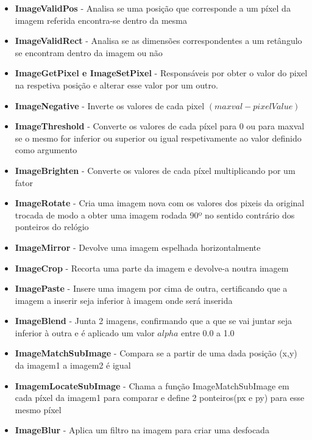     \begin{itemize}
        \item \textbf{ImageValidPos} - Analisa se uma posição que corresponde a um píxel da imagem referida
            encontra-se dentro da mesma
        \item \textbf{ImageValidRect} - Analisa se as dimensões correspondentes a um retângulo se encontram
            dentro da imagem ou não
        \item \textbf{ImageGetPixel e ImageSetPixel} - Responsáveis por obter o valor do pixel
            na respetiva posição e alterar esse valor por um outro.
        \item \textbf{ImageNegative} - Inverte os valores de cada pixel $(maxval - pixelValue)$
        \item \textbf{ImageThreshold} - Converte os valores de cada píxel para 0 ou para maxval
            se o mesmo for inferior ou superior ou igual respetivamente ao valor definido como argumento
        \item \textbf{ImageBrighten} - Converte os valores de cada píxel multiplicando por um fator
        \item \textbf{ImageRotate} - Cria uma imagem nova com os valores dos pixeis da original
            trocada de modo a obter uma imagem rodada 90º no sentido contrário dos ponteiros do relógio
        \item \textbf{ImageMirror} - Devolve uma imagem espelhada horizontalmente
        \item \textbf{ImageCrop} - Recorta uma parte da imagem e devolve-a noutra imagem
        \item \textbf{ImagePaste} - Insere uma imagem por cima de outra, certificando que
            a imagem a inserir seja inferior à imagem onde será inserida
        \item \textbf{ImageBlend} - Junta 2 imagens, confirmando que a que se vai juntar seja 
         inferior à outra e é aplicado um valor $alpha$ entre 0.0 a 1.0
        \item \textbf{ImageMatchSubImage} - Compara se a partir de uma dada posição (x,y) 
            da imagem1 a imagem2 é igual
        \item \textbf{ImagemLocateSubImage} - Chama a função ImageMatchSubImage em cada píxel da
            imagem1 para comparar e define 2 ponteiros(px e py) para esse mesmo píxel
        \item \textbf{ImageBlur} - Aplica um filtro na imagem para criar uma desfocada
    \end{itemize}

    